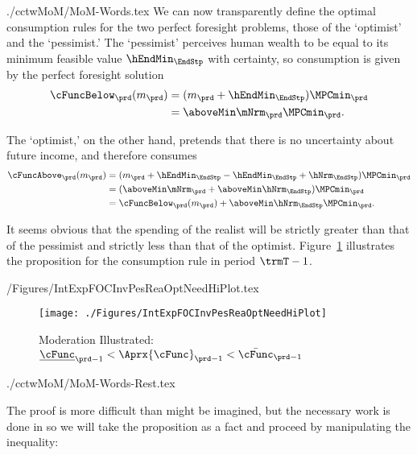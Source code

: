 \documentclass[\econtexRoot/SolvingMicroDSOPs]{subfiles}
\begin{document}
\begin{verbatimwrite}{./cctwMoM/MoM-Words.tex}
  We can now transparently define the optimal
  consumption rules for the two perfect foresight problems, those of the
  `optimist' and the `pessimist.'  The `pessimist' perceives human
  wealth to be equal to its minimum feasible value $\hEndMin_{\EndStp}$ with certainty, so
  consumption is given by the perfect foresight solution
  \begin{equation*}\begin{gathered}\begin{aligned}
        \cFuncBelow_{\prd}(m_{\prd})  & = ({m}_{\prd}+\hEndMin_{\EndStp})\MPCmin_{\prd}
        \\  & = \aboveMin \mNrm_{\prd}\MPCmin_{\prd}
        .
      \end{aligned}\end{gathered}\end{equation*}

  The `optimist,' on the other hand, pretends that there is no uncertainty
  about future income, and therefore consumes
  \begin{equation*}\begin{gathered}\begin{aligned}
        \cFuncAbove_{\prd}(m_{\prd})  & = ({m}_{\prd} +\hEndMin_{\EndStp} - \hEndMin_{\EndStp} + \hNrm_{\EndStp} )\MPCmin_{\prd}
        \\    & = (\aboveMin \mNrm_{\prd} + \aboveMin \hNrm_{\EndStp})\MPCmin_{\prd}
        \\      & = \cFuncBelow_{\prd}(m_{\prd})+\aboveMin \hNrm_{\EndStp} \MPCmin_{\prd}
        .
      \end{aligned}\end{gathered}\end{equation*}

  It seems obvious that the spending of the realist will be strictly greater
  than that of the pessimist and strictly less than that of the
  optimist.  Figure~\ref{fig:IntExpFOCInvPesReaOptNeedHiPlot} illustrates the proposition for the consumption rule in period $\trmT-1$.
\end{verbatimwrite}
\unskip
\begin{verbatimwrite}{\econtexRoot/Figures/IntExpFOCInvPesReaOptNeedHiPlot.tex}
  \hypertarget{IntExpFOCInvPesReaOptNeedHiPlot}{}
  \begin{figure}
    \texttt{[image: ./Figures/IntExpFOCInvPesReaOptNeedHiPlot]}
    \caption{Moderation Illustrated: $\underline{\cFunc}_{\prd-1} < \Aprx{\cFunc}_{\prd-1} < \bar{\cFunc}_{\prd-1}$}
    \label{fig:IntExpFOCInvPesReaOptNeedHiPlot}
  \end{figure}
\end{verbatimwrite}
\unskip
\begin{verbatimwrite}{./cctwMoM/MoM-Words-Rest.tex}

  \indent The proof is more difficult than might be imagined, but
  the necessary work is done in \cite{BufferStockTheory} so we will take
  the proposition as a fact and proceed by manipulating the inequality:
\end{verbatimwrite}
\unskip
\end{document}
